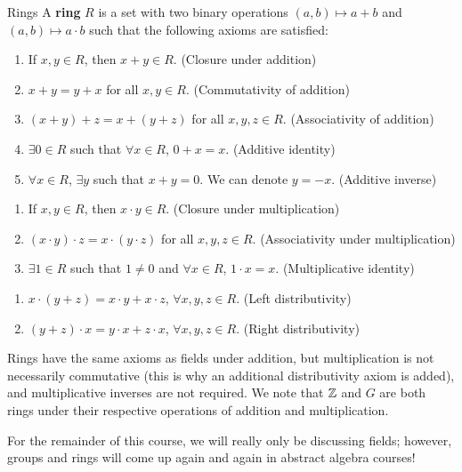\begin{ndef}{Rings}
    A \textbf{ring} $R$ is a set with two binary operations $(a,b) \mapsto a + b$ and $(a, b) \mapsto a \cdot b$ such that the following axioms are satisfied:
    \begin{enumerate}[start=1, label={(A\arabic*):}]
        \item If $x, y \in R$, then $x + y \in R$. (Closure under addition)
        \item $x + y = y + x$ for all $x, y \in R$. (Commutativity of addition)
        \item $(x+y) + z = x + (y + z)$ for all $x, y, z \in R$. (Associativity of addition)
        \item $\exists 0 \in R$ such that $\forall x \in R$, $0 + x = x$. (Additive identity)
        \item $\forall x \in R$, $\exists y$ such that $x + y = 0$. We can denote $y = -x$. (Additive inverse)
        \end{enumerate}
        \begin{enumerate}[start=1, label={(M\arabic*):}]
            \item If $x, y \in R$, then $x\cdot y\in R$. (Closure under multiplication)
            \item $(x\cdot y)\cdot z = x \cdot (y \cdot z)$ for all $x, y, z \in R$. (Associativity under multiplication)
            \item $\exists 1 \in R$ such that $1 \neq 0$ and $\forall x \in R$, $1 \cdot x = x$. (Multiplicative identity)
        \end{enumerate}
        \begin{enumerate}[start=1, label={(D\arabic*):}]
            \item $x \cdot (y + z) = x \cdot y + x \cdot z$, $\forall x, y, z \in R$. (Left distributivity)
            \item $(y + z) \cdot x = y \cdot x + z \cdot x$, $\forall x, y, z \in R$. (Right distributivity)
        \end{enumerate}
\end{ndef}
Rings have the same axioms as fields under addition, but multiplication is not necessarily commutative (this is why an additional distributivity axiom is added), and multiplicative inverses are not required. We note that $\mathbb{Z}$ and $G$ are both rings under their respective operations of addition and multiplication. 

For the remainder of this course, we will really only be discussing fields; however, groups and rings will come up again and again in abstract algebra courses!



